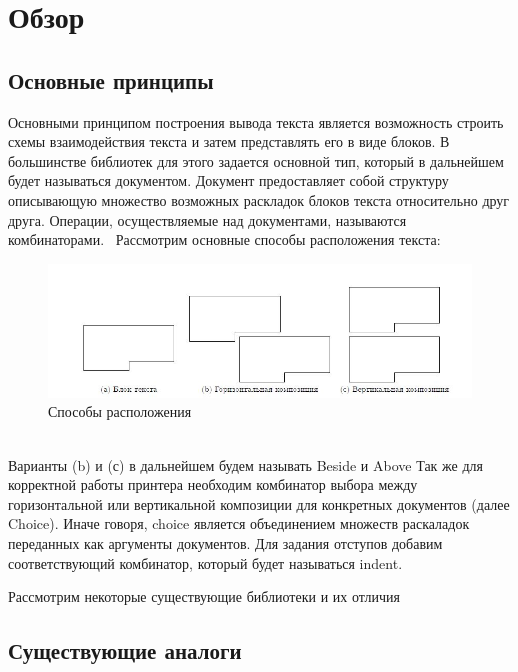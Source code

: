 \documentclass{matmex-diploma}
\begin{document}
\section{Обзор}
\subsection{Основные принципы}
Основными принципом построения вывода текста является возможность строить схемы взаимодействия текста и затем представлять его в виде блоков. В большинстве библиотек для этого задается основной тип, который в дальнейшем будет называться документом. Документ предоставляет собой структуру описывающую множество возможных раскладок блоков текста относительно друг друга. Операции, осуществляемые над документами, называются комбинаторами.~\cite{ podkopaevR}
Рассмотрим основные способы расположения текста:
\begin{figure}[h]
    \centering
    \includegraphics[scale=0.7]{Images/image10.png}
    \caption{Способы расположения}
\end{figure}
\\Варианты (b) и (с) в дальнейшем будем называть Beside и Above
Так же для корректной работы принтера необходим комбинатор выбора между горизонтальной или вертикальной композиции для конкретных документов (далее Choice). Иначе говоря, choice является объединением множеств раскаладок переданных как аргументы документов. Для задания отступов добавим соответствующий комбинатор, который будет называться indent.

Рассмотрим некоторые существующие библиотеки и их отличия
\subsection{Существующие аналоги}
\end{document}
